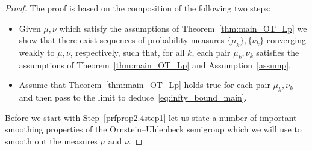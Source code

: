 \documentclass[10pt,a4paper]{amsart}
\newcommand{\source}{\mu}
\newcommand{\target}{\nu}
\newcounter{setofstep}
\newcounter{step}[setofstep]
\theoremstyle{definition}\newtheorem{defi}[theo]{Definition}
\begin{document}
\begin{proof}
The proof is based on the composition of the following two steps:
\begin{itemize}%
\item[Step~\ref{prfprop2.4step1}:] Given $\source,\target$ which satisfy the assumptions of Theorem~\ref{thm:main_OT_Lp} we show that there exist sequences of probability measures $\{\source_k\},\{\target_k\}$ converging weakly to $\source,\target$, respectively, such that, for all $k$, each pair $\source_k,\target_k$ satisfies the assumptions of Theorem~\ref{thm:main_OT_Lp} and Assumption~\ref{assump}.

\item[Step~\ref{prfprop2.4step2}:] Assume that Theorem~\ref{thm:main_OT_Lp} holds true for each pair $\source_k,\target_k$ and then pass to the limit to deduce~\eqref{eq:infty_bound_main}.
\end{itemize}

Before we start with Step~\ref{prfprop2.4step1} let us state a number of important smoothing properties of the Ornstein--Uhlenbeck semigroup which we will use to smooth out the measures $\source$ and $\target$.



\end{proof}
\end{document}
